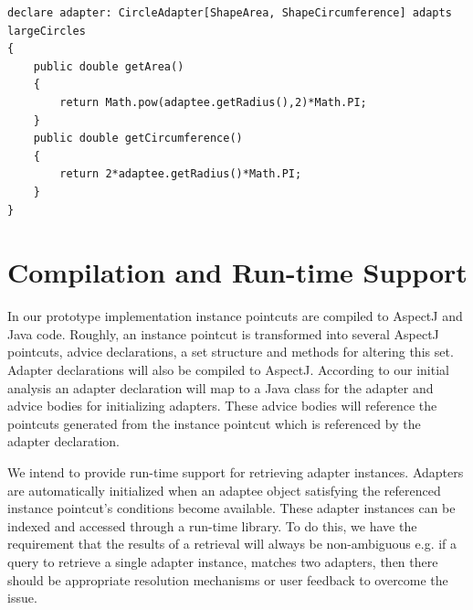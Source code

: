 \documentclass{llncs}
\begin{document}
\begin{lstlisting}[float, label={circleadapter}, caption={The adapter declaration for \textsf{Circle} objects}]
declare adapter: CircleAdapter[ShapeArea, ShapeCircumference] adapts largeCircles
{
	public double getArea()
	{
		return Math.pow(adaptee.getRadius(),2)*Math.PI;
	}
	public double getCircumference()
	{
		return 2*adaptee.getRadius()*Math.PI;
	}
}
\end{lstlisting} 

\section{Compilation and Run-time Support}
In our prototype implementation instance pointcuts are compiled to AspectJ and Java code. Roughly, an instance pointcut is transformed into several AspectJ pointcuts, advice declarations, a set structure and methods for altering this set.  Adapter declarations will also be compiled to AspectJ. According to our initial analysis an adapter declaration will map to a Java class for the adapter and advice bodies for initializing adapters. These advice bodies will reference the pointcuts generated from the instance pointcut which is referenced by the adapter declaration. 

We intend to provide run-time support for retrieving adapter instances. Adapters are automatically initialized when an adaptee object satisfying the referenced instance pointcut's conditions become available. These adapter instances can be indexed and accessed through a run-time library. To do this, we have the requirement that the results of a retrieval will always be non-ambiguous e.g. if a query to retrieve a single adapter instance, matches two adapters, then there should be appropriate resolution mechanisms or user feedback to overcome the issue. 






{}

\end{document}
